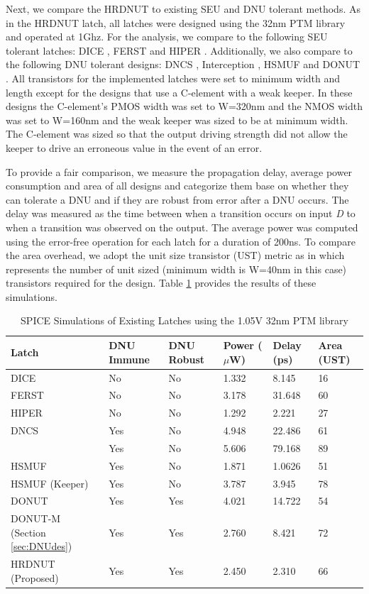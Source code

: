 Next, we compare the HRDNUT to existing SEU and DNU tolerant methods. As in the HRDNUT latch, all latches were designed using the 32nm PTM library and operated at 1Ghz. For the analysis, we compare to the following SEU tolerant latches: DICE \cite{DICE}, FERST \cite{FERST} and HIPER \cite{HIPER}. Additionally, we also compare to the following DNU tolerant designs: DNCS \cite{DNCS}, Interception \cite{Inter}, HSMUF \cite{HSMUF} and DONUT \cite{DONUT}. All transistors for the implemented latches were set to minimum width and length except for the designs that use a C-element with a weak keeper. In these designs the C-element's PMOS width was set to W=320nm and the NMOS width was set to W=160nm and the weak keeper was sized to be at minimum width. The C-element was sized so that the output driving strength did not allow the keeper to drive an erroneous value in the event of an error. 

To provide a fair comparison, we measure the propagation delay, average power consumption and area of all designs and categorize them base on whether they can tolerate a DNU and if they are robust from error after a DNU occurs. The delay was measured as the time between when a transition occurs on input \textit{D} to when a transition was observed on the output. The average power was computed using the error-free operation for each latch for a duration of 200ns. To compare the area overhead, we adopt the unit size transistor (UST) metric as in \cite{DNCS} which represents the number of unit sized (minimum width is W=40nm in this case) transistors required for the design. Table \ref{table:rtable} provides the results of these simulations.

\begin{table}[h]
\begin{center}
	\caption{SPICE Simulations of Existing Latches using the 1.05V 32nm PTM library }
	\label{table:rtable}
	\begin{tabular}{|m{5em}|m{3.5em}|m{3em}|m{3em}|m{3em}|m{3em}|}
	\hline
	Latch & DNU Immune & DNU Robust & Power ($\mu$W) & Delay (ps) & Area (UST)\\ 
	\hline
	DICE & No & No & 1.332 & 8.145 & 16 \\
	\hline
	FERST & No & No & 3.178 & 31.648 & 60 \\
	\hline
	HIPER & No & No & 1.292 & 2.221 & 27 \\
	\hhline{|=|=|=|=|=|=|}
	DNCS & Yes & No & 4.948 & 22.486 & 61 \\
	\hline
	\cite{Inter} & Yes & No & 5.606 & 79.168 & 89 \\
	\hline
	HSMUF & Yes & No & 1.871 & 1.0626 & 51 \\
	\hline
	HSMUF (Keeper) & Yes & No & 3.787 & 3.945 & 78 \\
	\hhline{|=|=|=|=|=|=|}
	DONUT \cite{DONUT} & Yes & Yes & 4.021 & 14.722 & 54 \\ 
	\hline
	DONUT-M (Section \ref{sec:DNUdes}) & Yes & Yes & 2.760 & 8.421 & 72\\
	\hline
	HRDNUT (Proposed) & Yes & Yes & 2.450 & 2.310 & 66 \\
	\hline
	\end{tabular}
\end{center}
\end{table}

